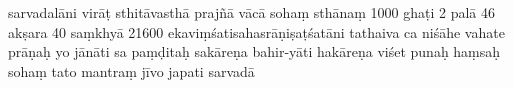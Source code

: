 \begin{ekdosis}
\begin{prose}
{        sarvadalāni\dd{}
        virāṭ 
        sthitāvasthā\dd{} 
        prajñā vācā\dd{}
        sohaṃ \dd{}
         sthānaṃ\dd{}
         \dd{} 1000 ghaṭi 2 palā 46 akṣara 40\dd{}
         saṃkhyā\dd{}
        21600\dd{}
        ekaviṃśatisahasrāṇiṣaṭśatāni\dd{}
        tathaiva ca niśāhe vahate\dd{}
        prāṇaḥ yo jānāti sa paṃḍitaḥ\dd{} %
        sakāreṇa bahir-yāti hakāreṇa viśet punaḥ\dd{}  
        haṃsaḥ sohaṃ\dd{}
        tato mantraṃ jīvo japati sarvadā\dd{}}
    \end{prose}
  \end{ekdosis}
